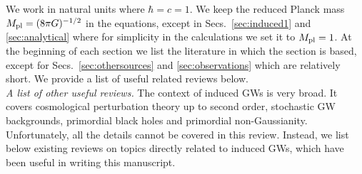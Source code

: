 \documentclass[a4paper,11pt]{article}
\numberwithin{equation}{section}
\begin{document}
We work in natural units where $\hbar=c=1$. We keep the reduced Planck mass $M_{\rm pl}=(8\pi G)^{-1/2}$ in the equations, except in Secs.~\ref{sec:induced1} and \ref{sec:analytical} where for simplicity in the calculations we set it to $M_{\rm pl}=1$. At the beginning of each section we list the literature in which the section is based, except for Secs.~\ref{sec:othersources} and \ref{sec:observations} which are relatively short. We provide a list of useful related reviews below.\\

\noindent\textit{A list of other useful reviews.} The context of induced GWs is very broad. It covers cosmological perturbation theory up to second order, stochastic GW backgrounds, primordial black holes and primordial non-Gaussianity. Unfortunately, all the details cannot be covered in this review. Instead, we list below existing reviews on topics directly related to induced GWs, which have been useful in writing this manuscript. 
\end{document}
